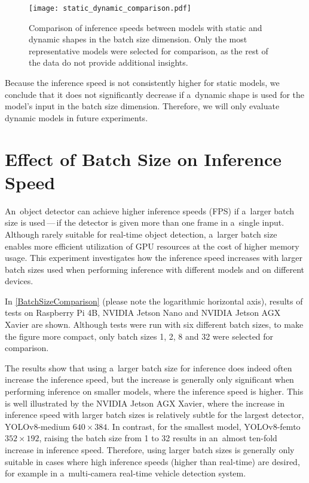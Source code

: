 \begin{figure}[t]
        \centering
        \texttt{[image: static\_dynamic\_comparison.pdf]}
        \caption{Comparison of inference speeds between models with static and
        dynamic shapes in the batch size dimension. Only the most representative
        models were selected for comparison, as the rest of the data do not
        provide additional insights.}
        \label{StaticDynamicModelShape}
\end{figure}

Because the inference speed is not consistently higher for static models, we
conclude that it does not significantly decrease if a~dynamic shape is used for
the model's input in the batch size dimension. Therefore, we will only evaluate
dynamic models in future experiments.


\section{Effect of Batch Size on Inference Speed}
\label{BatchSizeComparisonSection}

An~object detector can achieve higher inference speeds (FPS) if a~larger batch
size is used\,---\,if the detector is given more than one frame in a~single
input. Although rarely suitable for real-time object detection, a~larger batch
size enables more efficient utilization of GPU resources at the cost of higher
memory usage. This experiment investigates how the inference speed increases
with larger batch sizes used when performing inference with different models and
on different devices.

In \autoref{BatchSizeComparison} (please note the logarithmic horizontal axis),
results of tests on Raspberry Pi 4B, NVIDIA Jetson Nano and NVIDIA Jetson AGX
Xavier are shown. Although tests were run with six different batch sizes, to
make the figure more compact, only batch sizes 1, 2, 8 and 32 were selected for
comparison.

The results show that using a~larger batch size for inference does indeed often
increase the inference speed, but the increase is generally only significant
when performing inference on smaller models, where the inference speed is
higher. This is well illustrated by the NVIDIA Jetson AGX Xavier, where the
increase in inference speed with larger batch sizes is relatively subtle for the
largest detector, YOLOv8-medium $640 \times 384$. In contrast, for the smallest
model, YOLOv8-femto $352 \times 192$, raising the batch size from 1 to 32
results in an~almost ten-fold increase in inference speed. Therefore, using
larger batch sizes is generally only suitable in cases where high inference
speeds (higher than real-time) are desired, for example in a~multi-camera
real-time vehicle detection system.


